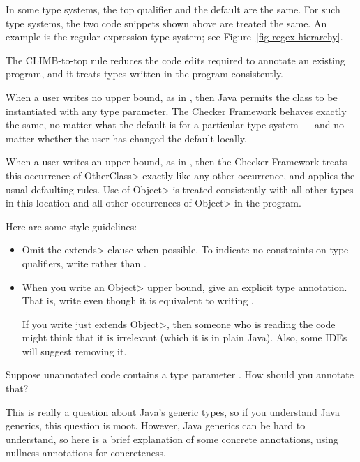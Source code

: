 In some type systems, the top qualifier and the default are the same.  For
such type systems, the two code snippets shown above are treated the same.
An example is the regular expression type system; see
Figure~\ref{fig-regex-hierarchy}.

The CLIMB-to-top rule reduces the code edits required to annotate an
existing program, and it treats types written in the program consistently.

When a user writes no upper bound, as in
,
then Java permits the class to be instantiated with any type parameter.
The Checker Framework behaves exactly the same, no matter what the default
is for a particular type system --- and no matter whether the user has
changed the default locally.

When a user writes an upper bound, as in
,
then the Checker Framework treats this occurrence of \<OtherClass> exactly
like any other occurrence, and applies the usual defaulting rules.  Use of
\<Object> is treated consistently with all other types in this location and
all other occurrences of \<Object> in the program.

Here are some style guidelines:
\begin{itemize}
\item
  Omit the \<extends> clause when possible.  To indicate no constraints on
  type qualifiers, write  rather than .
\item
  When you write an \<Object> upper bound, give an explicit type annotation.
  That is, write  even though it is equivalent to writing
  .

  If you write just \<extends Object>, then someone who is reading the code
  might think that it is irrelevant (which it is in plain Java).  Also,
  some IDEs will suggest removing it.
\end{itemize}



Suppose unannotated code contains a type parameter .  How should
you annotate that?

This is really a question about Java's generic types, so if you understand
Java generics, this question is moot.  However, Java generics can be hard
to understand, so here is a brief explanation of some concrete annotations,
using nullness annotations for concreteness.

